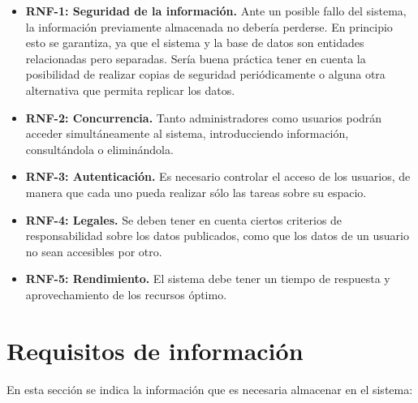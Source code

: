 \begin{itemize}
	\item \textbf{RNF-1: Seguridad de la información.} Ante un posible fallo del sistema, la información previamente almacenada no debería perderse. En principio esto se garantiza, ya que el sistema y la base de datos son entidades relacionadas pero separadas. Sería buena práctica tener en cuenta la posibilidad de realizar copias de seguridad periódicamente o alguna otra alternativa que permita replicar los datos.
	\item \textbf{RNF-2: Concurrencia.} Tanto administradores como usuarios podrán acceder simultáneamente al sistema, introducciendo información, consultándola o eliminándola.
	\item \textbf{RNF-3: Autenticación.} Es necesario controlar el acceso de los usuarios, de manera que cada uno pueda realizar sólo las tareas sobre su espacio.
	\item \textbf{RNF-4: Legales.} Se deben tener en cuenta ciertos criterios de responsabilidad sobre los datos publicados, como que los datos de un usuario no sean accesibles por otro.
	\item \textbf{RNF-5: Rendimiento.} El sistema debe tener un tiempo de respuesta	y aprovechamiento de los recursos óptimo.
\end{itemize}

\section{Requisitos de información}
En esta sección se indica la información que es necesaria almacenar en el sistema:

